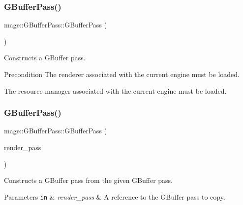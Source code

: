 \subsubsection{\texorpdfstring{G\+Buffer\+Pass()}{GBufferPass()}\hspace{0.1cm}{\footnotesize\ttfamily [1/3]}}
{\footnotesize\ttfamily mage\+::\+G\+Buffer\+Pass\+::\+G\+Buffer\+Pass (\begin{DoxyParamCaption}{ }\end{DoxyParamCaption})}

Constructs a G\+Buffer pass.

\begin{DoxyPrecond}{Precondition}
The renderer associated with the current engine must be loaded. 

The resource manager associated with the current engine must be loaded. 
\end{DoxyPrecond}
\hypertarget{classmage_1_1_g_buffer_pass_a3b9f59097aef9175f942c9c9424d0dab}{}\label{classmage_1_1_g_buffer_pass_a3b9f59097aef9175f942c9c9424d0dab} 
\subsubsection{\texorpdfstring{G\+Buffer\+Pass()}{GBufferPass()}\hspace{0.1cm}{\footnotesize\ttfamily [2/3]}}
{\footnotesize\ttfamily mage\+::\+G\+Buffer\+Pass\+::\+G\+Buffer\+Pass (\begin{DoxyParamCaption}\item[{const \hyperlink{classmage_1_1_g_buffer_pass}{G\+Buffer\+Pass} \&}]{render\+\_\+pass }\end{DoxyParamCaption})\hspace{0.3cm}{\ttfamily [delete]}}

Constructs a G\+Buffer pass from the given G\+Buffer pass.


\begin{DoxyParams}[1]{Parameters}
\mbox{\tt in}  & {\em render\+\_\+pass} & A reference to the G\+Buffer pass to copy. \\
\hline
\end{DoxyParams}
\hypertarget{classmage_1_1_g_buffer_pass_a86b04cb5e55d63a2fabc041ef0c7dcf9}{}\label{classmage_1_1_g_buffer_pass_a86b04cb5e55d63a2fabc041ef0c7dcf9} 
